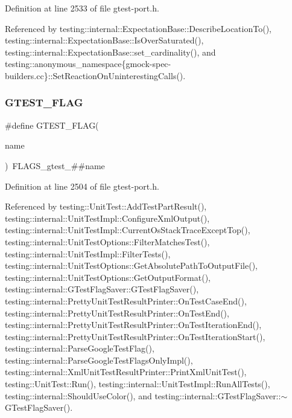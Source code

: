 Definition at line 2533 of file gtest-\/port.\+h.



Referenced by testing\+::internal\+::\+Expectation\+Base\+::\+Describe\+Location\+To(), testing\+::internal\+::\+Expectation\+Base\+::\+Is\+Over\+Saturated(), testing\+::internal\+::\+Expectation\+Base\+::set\+\_\+cardinality(), and testing\+::anonymous\+\_\+namespace\{gmock-\/spec-\/builders.\+cc\}\+::\+Set\+Reaction\+On\+Uninteresting\+Calls().

\mbox{\label{gtest-port_8h_a828f4e34a1c4b510da50ec1563e3562a}} 
\subsubsection{\texorpdfstring{G\+T\+E\+S\+T\+\_\+\+F\+L\+AG}{GTEST\_FLAG}}
{\footnotesize\ttfamily \#define G\+T\+E\+S\+T\+\_\+\+F\+L\+AG(\begin{DoxyParamCaption}\item[{}]{name }\end{DoxyParamCaption})~F\+L\+A\+G\+S\+\_\+gtest\+\_\+\#\#name}



Definition at line 2504 of file gtest-\/port.\+h.



Referenced by testing\+::\+Unit\+Test\+::\+Add\+Test\+Part\+Result(), testing\+::internal\+::\+Unit\+Test\+Impl\+::\+Configure\+Xml\+Output(), testing\+::internal\+::\+Unit\+Test\+Impl\+::\+Current\+Os\+Stack\+Trace\+Except\+Top(), testing\+::internal\+::\+Unit\+Test\+Options\+::\+Filter\+Matches\+Test(), testing\+::internal\+::\+Unit\+Test\+Impl\+::\+Filter\+Tests(), testing\+::internal\+::\+Unit\+Test\+Options\+::\+Get\+Absolute\+Path\+To\+Output\+File(), testing\+::internal\+::\+Unit\+Test\+Options\+::\+Get\+Output\+Format(), testing\+::internal\+::\+G\+Test\+Flag\+Saver\+::\+G\+Test\+Flag\+Saver(), testing\+::internal\+::\+Pretty\+Unit\+Test\+Result\+Printer\+::\+On\+Test\+Case\+End(), testing\+::internal\+::\+Pretty\+Unit\+Test\+Result\+Printer\+::\+On\+Test\+End(), testing\+::internal\+::\+Pretty\+Unit\+Test\+Result\+Printer\+::\+On\+Test\+Iteration\+End(), testing\+::internal\+::\+Pretty\+Unit\+Test\+Result\+Printer\+::\+On\+Test\+Iteration\+Start(), testing\+::internal\+::\+Parse\+Google\+Test\+Flag(), testing\+::internal\+::\+Parse\+Google\+Test\+Flags\+Only\+Impl(), testing\+::internal\+::\+Xml\+Unit\+Test\+Result\+Printer\+::\+Print\+Xml\+Unit\+Test(), testing\+::\+Unit\+Test\+::\+Run(), testing\+::internal\+::\+Unit\+Test\+Impl\+::\+Run\+All\+Tests(), testing\+::internal\+::\+Should\+Use\+Color(), and testing\+::internal\+::\+G\+Test\+Flag\+Saver\+::$\sim$\+G\+Test\+Flag\+Saver().

